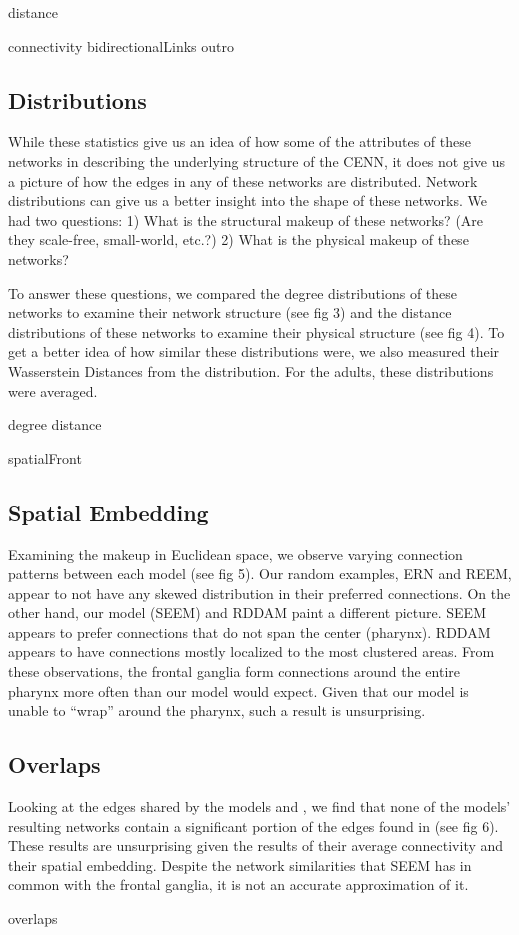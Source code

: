 {distance}

{connectivity}
{bidirectionalLinks}
{outro}

\subsection{Distributions}

While these statistics give us an idea of how some of the attributes of these networks in describing the underlying structure of the CENN, it does not give us a picture of how the edges in any of these networks are distributed. 
Network distributions can give us a better insight into the shape of these networks.
We had two questions: 
1) What is the structural makeup of these networks? (Are they scale-free, small-world, etc.?) 
2) What is the physical makeup of these networks?

To answer these questions, we compared the degree distributions of these networks to examine their network structure (see fig 3) and the distance distributions of these networks to examine their physical structure (see fig 4). 
To get a better idea of how similar these distributions were, we also measured their Wasserstein Distances from the \ce distribution. 
For the adults, these distributions were averaged.

{degree}
{distance}

{spatialFront}

\subsection{Spatial Embedding}
Examining the makeup in Euclidean space, we observe varying connection patterns between each model (see fig 5). 
Our random examples, ERN and REEM, appear to not have any skewed distribution in their preferred connections. 
On the other hand, our model (SEEM) and RDDAM paint a different picture. 
SEEM appears to prefer connections that do not span the center (pharynx). 
RDDAM appears to have connections mostly localized to the most clustered areas.
From these observations, the \ce frontal ganglia form connections around the entire pharynx more often than our model would expect.
Given that our model is unable to ``wrap'' around the pharynx, such a result is unsurprising.

\subsection{Overlaps}
Looking at the edges shared by the models and \ce, we find that none of the models' resulting networks contain a significant portion of the edges found in \ce (see fig 6). 
These results are unsurprising given the results of their average connectivity and their spatial embedding.
Despite the network similarities that SEEM has in common with the \ce frontal ganglia, it is not an accurate approximation of it.

{overlaps}